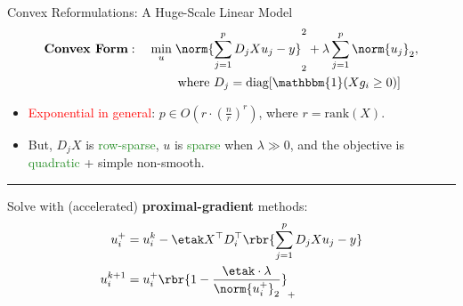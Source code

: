\documentclass[usenames,dvipsnames,mathserif,notheorems]{beamer}
\begin{document}
\begin{frame}{Convex Reformulations: A Huge-Scale Linear Model}
	\vspace{-2em}
	\[
		\begin{aligned}
			\textbf{Convex Form}: \quad
			\min_{u} \; & \norm{\sum_{j=1}^p D_j X u_j - y}_2^2 +
			\lambda \sum_{j=1}^p \norm{u_j}_2,                    \\
			            & \hspace{0.2em} \text{where }
			D_j = \text{diag}[\mathbbm{1}(X g_i \geq 0)]
		\end{aligned}
	\]
	\begin{itemize}
		\item \textcolor{red}{Exponential in general}: \( p \in O(r \cdot (\frac{n}{r})^r) \),
		      where \( r = \text{rank}(X) \).
		      \vspace{0.2em}

		\item But, \( D_j X \) is \textcolor{ForestGreen}{row-sparse}, \( u \) is \textcolor{ForestGreen}{sparse} when
		      \( \lambda \gg 0 \), and the objective is \textcolor{ForestGreen}{quadratic} + simple non-smooth.
	\end{itemize}

	\pause

	{
		\vspace{-0.5em}
		\center \rule{\textwidth}{0.1em}
		\vspace{-0.2em}
	}
	Solve with (accelerated) \textbf{proximal-gradient} methods:
	\begin{align*}
		u_i^+
		 & = u_i^k - \etak X^\top D_i^\top \rbr{\sum_{j=1}^p D_j X u_j - y} \\
		u_i^{k+1}
		 & = u_i^+ \rbr{1 - \frac{\etak \cdot \lambda}{\norm{u_i^+}_2}}_+
	\end{align*}

\end{frame}
\end{document}
